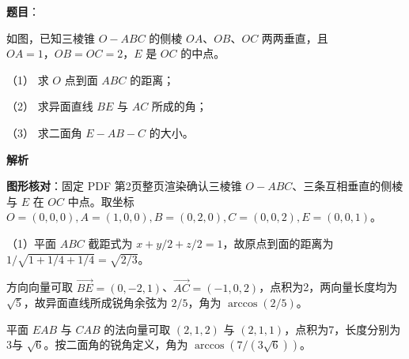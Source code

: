 \begin{answer}

\textbf{题目}：

如图，已知三棱锥 $O-ABC$ 的侧棱 $OA\text{、}OB\text{、}OC$ 两两垂直，且 $OA=1\text{，}OB=OC=2\text{，}E$ 是 $OC$ 的中点。

（1） 求 $O$ 点到面 $ABC$ 的距离；

（2） 求异面直线 $BE$ 与 $AC$ 所成的角；

（3） 求二面角 $E-AB-C$ 的大小。
\nopagebreak[4]
\begin{center}\end{center}
\nopagebreak[4]
\textbf{解析}


\textbf{图形核对}：固定 PDF 第2页整页渲染确认三棱锥 $O-ABC$、三条互相垂直的侧棱与 $E$ 在 $OC$ 中点。取坐标 $O=(0,0,0), A=(1,0,0), B=(0,2,0), C=(0,0,2), E=(0,0,1)$。

（1）平面 $ABC$ 截距式为 $x+y/2+z/2=1$，故原点到面的距离为 $1/\sqrt{1+1/4+1/4}=\sqrt{2/3}$。


方向向量可取 $\overrightarrow{BE}=(0,-2,1)$、$\overrightarrow{AC}=(-1,0,2)$，点积为2，两向量长度均为 $\sqrt5$，故异面直线所成锐角余弦为 $2/5$，角为 $\arccos(2/5)$。


平面 $EAB$ 与 $CAB$ 的法向量可取 $(2,1,2)$ 与 $(2,1,1)$，点积为7，长度分别为3与 $\sqrt6$。按二面角的锐角定义，角为 $\arccos(7/(3\sqrt6))$。




\end{answer}

